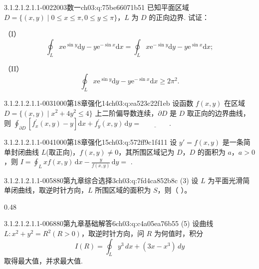 \begin{q}{3.1.2.1.2.1.1-002}{2003数一}{ch03:q:75be66071b51}
已知平面区域 $D=\{(x,y)\mid 0\leqslant x\leqslant \pi,0\leqslant y\leqslant \pi\}$，$L$ 为 $D$ 的正向边界. 试证：

（I）\[\oint_L x\mathrm{e}^{\sin y}\mathrm{d}y-y\mathrm{e}^{-\sin x}\mathrm{d}x=\oint_L x\mathrm{e}^{-\sin y}\mathrm{d}y-y\mathrm{e}^{\sin x}\mathrm{d}x;\]

（II）\[\oint_L x\mathrm{e}^{\sin y}\mathrm{d}y-y\mathrm{e}^{-\sin x}\mathrm{d}x\geqslant 2\pi^2.\]
\end{q}

\begin{q}{3.1.2.1.2.1.1-003}{1000第18章强化14}{ch03:q:ea523c22f1eb}
设函数 $f(x,y)$ 在区域 $D=\{(x,y)\mid x^{2}+4y^{2}\leqslant 4\}$ 上二阶偏导数连续，$\partial D$ 是 $D$ 取正向的边界曲线，则 $\displaystyle \oint_{\partial D}\left[f_{x}^{\prime}(x,y)-y\right]\mathrm{d}x+f_{y}^{\prime}(x,y)\,\mathrm{d}y=\underline{\hspace{4em}}$.
\end{q}

\begin{q}{3.1.2.1.2.1.1-004}{1000第18章强化15}{ch03:q:572ff9c1f411}
设 $y'=f(x,y)$ 是一条简单封闭曲线 $L$(取正向)，$f(x,y)\neq 0$，其所围区域记为 $D$，$D$ 的面积为 $a$，$a>0$，则 $\displaystyle I=\oint_L x f(x,y)\,\mathrm{d}x-\frac{y}{f(x,y)}\,\mathrm{d}y=$ \underline{\hspace{4em}}.
\end{q}

\begin{q}{3.1.2.1.2.1.1-005}{880第九章综合选择3}{ch03:q:7fd4ca852b8c}
(3) 设 $L$ 为平面光滑简单闭曲线，取逆时针方向，$L$ 所围区域的面积为 $S$，则（ ）。
\begin{opts}{0.48}
\hfill{}\\[0.3ex]
\hfill{}
\end{opts}
\end{q}

\begin{q}{3.1.2.1.2.1.1-006}{880第九章基础解答6}{ch03:q:c4a05ea76b55}
(5) 设曲线 $L:x^2+y^2=R^2(R>0)$，取逆时针方向，问 $R$ 为何值时，积分 \[ I(R)=\oint_L y^3\,dx+(3x-x^3)\,dy \] 取得最大值，并求最大值.
\end{q}

